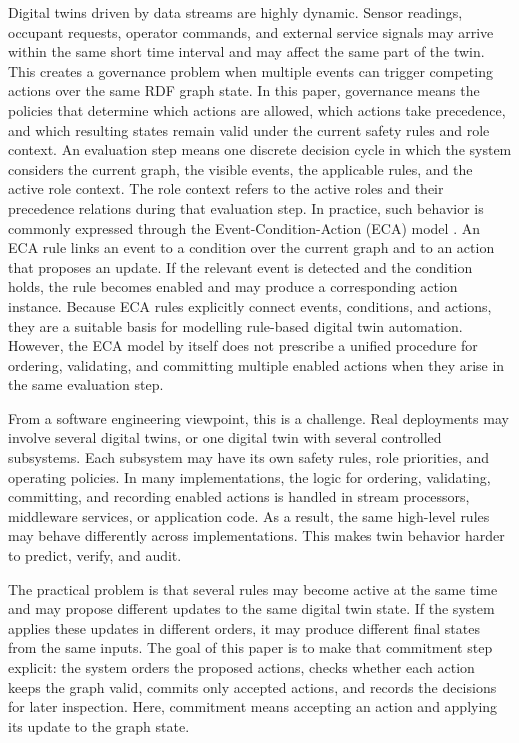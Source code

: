 \documentclass{ieeeaccess}
\theoremstyle{definition}
\theoremstyle{plain}
\theoremstyle{remark}
\begin{document}
Digital twins driven by data streams are highly dynamic. Sensor readings, occupant requests, operator commands, and external service signals may arrive within the same short time interval and may affect the same part of the twin. This creates a governance problem when multiple events can trigger competing actions over the same RDF graph state. In this paper, governance means the policies that determine which actions are allowed, which actions take precedence, and which resulting states remain valid under the current safety rules and role context. An evaluation step means one discrete decision cycle in which the system considers the current graph, the visible events, the applicable rules, and the active role context. The role context refers to the active roles and their precedence relations during that evaluation step. In practice, such behavior is commonly expressed through the Event-Condition-Action (ECA) model \cite{Paton1999ActiveDatabaseSystems}. An ECA rule links an event to a condition over the current graph and to an action that proposes an update. If the relevant event is detected and the condition holds, the rule becomes enabled and may produce a corresponding action instance. Because ECA rules explicitly connect events, conditions, and actions, they are a suitable basis for modelling rule-based digital twin automation. However, the ECA model by itself does not prescribe a unified procedure for ordering, validating, and committing multiple enabled actions when they arise in the same evaluation step.

From a software engineering viewpoint, this is a challenge. Real deployments may involve several digital twins, or one digital twin with several controlled subsystems. Each subsystem may have its own safety rules, role priorities, and operating policies. In many implementations, the logic for ordering, validating, committing, and recording enabled actions is handled in stream processors, middleware services, or application code. As a result, the same high-level rules may behave differently across implementations. This makes twin behavior harder to predict, verify, and audit.

The practical problem is that several rules may become active at the same time and may propose different updates to the same digital twin state. If the system applies these updates in different orders, it may produce different final states from the same inputs. The goal of this paper is to make that commitment step explicit: the system orders the proposed actions, checks whether each action keeps the graph valid, commits only accepted actions, and records the decisions for later inspection. Here, commitment means accepting an action and applying its update to the graph state.
\end{document}
